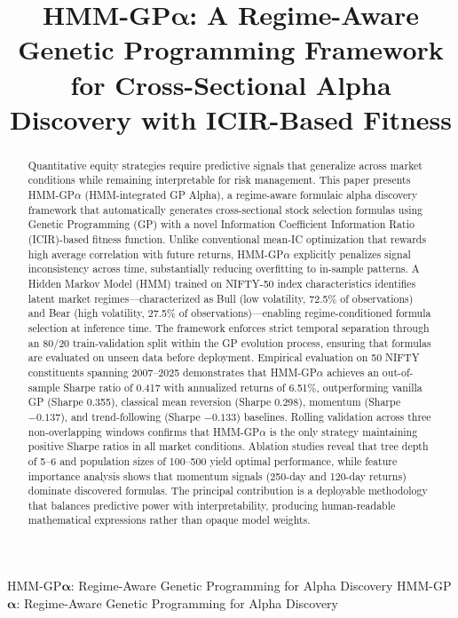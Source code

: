 \documentclass{ieeeaccess}
\begin{document}

\title{HMM-GP$\boldsymbol{\alpha}$: A Regime-Aware Genetic Programming Framework for Cross-Sectional Alpha Discovery with ICIR-Based Fitness}

\author{}

\address[1]{}

\tfootnote{}

\markboth
{HMM-GP$\boldsymbol{\alpha}$: Regime-Aware Genetic Programming for Alpha Discovery}
{HMM-GP$\boldsymbol{\alpha}$: Regime-Aware Genetic Programming for Alpha Discovery}

\corresp{}

\begin{abstract}
Quantitative equity strategies require predictive signals that generalize across market conditions while remaining interpretable for risk management. This paper presents HMM-GP$\alpha$ (HMM-integrated GP Alpha), a regime-aware formulaic alpha discovery framework that automatically generates cross-sectional stock selection formulas using Genetic Programming (GP) with a novel Information Coefficient Information Ratio (ICIR)-based fitness function. Unlike conventional mean-IC optimization that rewards high average correlation with future returns, HMM-GP$\alpha$ explicitly penalizes signal inconsistency across time, substantially reducing overfitting to in-sample patterns. A Hidden Markov Model (HMM) trained on NIFTY-50 index characteristics identifies latent market regimes---characterized as Bull (low volatility, 72.5\% of observations) and Bear (high volatility, 27.5\% of observations)---enabling regime-conditioned formula selection at inference time. The framework enforces strict temporal separation through an 80/20 train-validation split within the GP evolution process, ensuring that formulas are evaluated on unseen data before deployment. Empirical evaluation on 50 NIFTY constituents spanning 2007--2025 demonstrates that HMM-GP$\alpha$ achieves an out-of-sample Sharpe ratio of 0.417 with annualized returns of 6.51\%, outperforming vanilla GP (Sharpe 0.355), classical mean reversion (Sharpe 0.298), momentum (Sharpe $-0.137$), and trend-following (Sharpe $-0.133$) baselines. Rolling validation across three non-overlapping windows confirms that HMM-GP$\alpha$ is the only strategy maintaining positive Sharpe ratios in all market conditions. Ablation studies reveal that tree depth of 5--6 and population sizes of 100--500 yield optimal performance, while feature importance analysis shows that momentum signals (250-day and 120-day returns) dominate discovered formulas. The principal contribution is a deployable methodology that balances predictive power with interpretability, producing human-readable mathematical expressions rather than opaque model weights.
\end{abstract}
\end{document}
